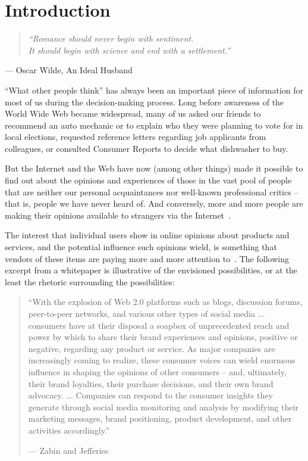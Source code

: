 \section{Introduction}
\label{sec:introduction1}

\hfill

\begin{quote}
\centering
\textit{
``Romance should never begin with sentiment. \\
It should begin with science and end with a settlement.''
}
\end{quote}
\hfill --- Oscar Wilde, An Ideal Husband

\hfill

\hfill

``What other people think'' has always been an important piece of information
for most of us during the decision-making process.
Long before awareness of the World Wide Web became widespread,
many of us asked our friends to recommend an auto mechanic
or to explain who they were planning to vote for in local elections,
requested reference letters regarding job applicants from colleagues,
or consulted Consumer Reports to decide what dishwasher to buy.

But the Internet and the Web have now (among other things) made it possible
to find out about the opinions and experiences of those in the vast pool of people that are neither our personal acquaintances
nor well-known professional critics --
that is, people we have never heard of.
And conversely, more and more people are making their opinions available
to strangers via the Internet~\cite{PL08}.

The interest that individual users show in online opinions
about products and services,
and the potential influence such opinions wield,
is something that vendors of these items are paying more and more attention to~\cite{Hof08}.
The following excerpt from a whitepaper is illustrative
of the envisioned possibilities,
or at the least the rhetoric surrounding the possibilities:

\begin{quote}
``With the explosion of Web 2.0 platforms
such as blogs, discussion forums, peer-to-peer networks,
and various other types of social media ...
consumers have at their disposal a soapbox
of unprecedented reach and power
by which to share their brand experiences and opinions,
positive or negative, regarding any product or service.
As major companies are increasingly coming to realize,
these consumer voices can wield enormous influence
in shaping the opinions of other consumers --
and, ultimately, their brand loyalties, their purchase decisions,
and their own brand advocacy. ...
Companies can respond to the consumer insights they generate
through social media monitoring and analysis
by modifying their marketing messages, brand positioning, product development,
and other activities accordingly.''

\hfill --- Zabin and Jefferies~\cite{ZJ08}
\end{quote}

